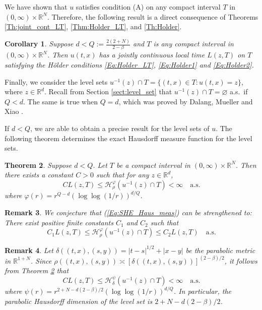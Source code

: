 \documentclass[11pt, reqno]{amsart}
\newtheorem{theorem}{Theorem}[section]
\newtheorem{corollary}[theorem]{Corollary}
\newtheorem{remark}[theorem]{Remark}
\def\R{{\mathbb R}}
\numberwithin{equation}{section}
\begin{document}
We have shown that $u$ satisfies condition (A) on any compact interval $T$ in $(0, \infty) \times \R^N$.
Therefore, the following result is a direct consequence of Theorems \ref{Th:joint_cont_LT}, \ref{Thm:Holder_LT},
and \ref{Th:Holder}.

\begin{corollary}\label{cor:LT}
Suppose $d < Q := \frac{2(2+N)}{2-\beta}$ and $T$ is any compact interval in $(0, \infty) \times \R^N$.
Then $u(t, x)$ has a jointly continuous local time $L(z, T)$ on $T$ satisfying the H\"older conditions 
\eqref{Eq:Holder_LT}, \eqref{Eq:Holder1} and \eqref{Eq:Holder2}.
\end{corollary}

Finally, we consider the level sets $u^{-1}(z) \cap T = \{ (t, x) \in T : u(t, x) = z \}$, where $z \in \R^d$.
Recall from Section \ref{sect:level_set} that $u^{-1}(z) \cap T = \varnothing$ a.s.~if $Q < d$. The same 
is true when $Q = d$, which was proved by Dalang, Mueller and Xiao \cite{DMX17}. 

If $d < Q$, we are able to obtain a precise result for the level sets of $u$.
The following theorem determines the exact Hausdorff measure function for the level sets.

\begin{theorem}\label{Thm:SHE_Haus_meas}
Suppose $d < Q$. Let $T$ be a compact interval in $(0, \infty) \times \R^N$. 
Then there exists a constant $C > 0$ such that for any $z \in \R^d$,
\begin{equation}\label{Eq:SHE_Haus_meas}
CL(z, T) \le \mathcal{H}_\rho^\varphi(u^{-1}(z) \cap T) < \infty \quad \text{a.s.}
\end{equation}
where $\varphi(r) = r^{Q-d} (\log\log(1/r))^{d/Q}$.
\end{theorem}

\begin{remark}
We conjecture that (\ref{Eq:SHE_Haus_meas}) can be strengthened to: There exist positive finite constants 
$C_1$ and $C_2$ such that
\[ C_1L(z, T) \le \mathcal{H}_\rho^\varphi(u^{-1}(z) \cap T) \le C_2 L(z, T) \quad \text{a.s.} \]
\end{remark}

\begin{remark}
Let $\delta((t, x),(s,y)) = |t-s|^{1/2} + |x-y|$ be the parabolic metric in $\R^{1+N}$. Since 
$\rho((t, x), (s, y)) \asymp [\delta((t, x),(s,y))]^{(2-\beta)/2}$, it follows from Theorem \ref{Thm:SHE_Haus_meas} 
that
\[ CL(z, T) \le \mathcal{H}^\psi_\delta(u^{-1}(z)\cap T) < \infty \quad \text{a.s.}
\]
where $\psi(r) = r^{2+N-d(2-\beta)/2} (\log\log(1/r))^{d/Q}$. In particular, the parabolic Hausdorff 
dimension of the level set is $2+N - d(2-\beta)/2$.
\end{remark}
\end{document}
